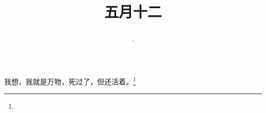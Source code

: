 \title{\date[d=17,m=6,y=2024][year:cn-y,年,month:cn,day:cn,日,·,weekday]·五月十二 }
我想，我就是万物，死过了，但还活着。\footnote{ }

